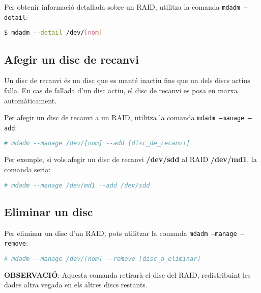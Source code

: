 Per obtenir informació detallada sobre un RAID, utilitza la comanda \texttt{mdadm --detail}:

\begin{lstlisting}[language=bash, numbers=none]
$ mdadm --detail /dev/[nom]
\end{lstlisting}


\subsection{Afegir un disc de recanvi}\label{afegir-un-disc-de-recanvi}

 Un disc de recanvi és un disc que es manté inactiu fins que un dels discs actius falla. En cas de fallada d'un disc actiu, el disc de recanvi es posa en marxa automàticament.
 
 Per afegir un disc de recanvi a un RAID, utilitza la comanda \texttt{mdadm --manage --add}:

\begin{lstlisting}[language=bash, numbers=none, commentstyle=\color{black}]
# mdadm --manage /dev/[nom] --add [disc_de_recanvi]
\end{lstlisting}

Per exemple, si vols afegir un disc de recanvi \textbf{/dev/sdd} al RAID
\textbf{/dev/md1}, la comanda seria:

\begin{lstlisting}[language=bash, numbers=none, commentstyle=\color{black}]
# mdadm --manage /dev/md1 --add /dev/sdd
\end{lstlisting}

\subsection{Eliminar un disc}\label{eliminar-un-disc}

Per eliminar un disc d'un RAID, pots utilitzar la comanda \texttt{mdadm
--manage --remove}:

\begin{lstlisting}[language=bash, numbers=none, commentstyle=\color{black}]
# mdadm --manage /dev/[nom] --remove [disc_a_eliminar]
\end{lstlisting}

\begin{mdframed}[linewidth=2pt,linecolor=teal]
\textbf{OBSERVACIÓ}: Aquesta comanda retirarà el disc del RAID,
redistribuint les dades altra vegada en els altres discs restants.
\end{mdframed}

